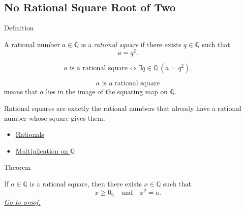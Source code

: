 \subsection*{No Rational Square Root of Two}

\begin{definitionbox}{Definition}
\begin{definition}
\label{def:rational-square}
A rational number $a\in\mathbb{Q}$ is a \emph{rational square} if there
exists $q\in\mathbb{Q}$ such that
\[
a=q^2.
\]
\end{definition}
\end{definitionbox}

\begin{remark*}
\[
\text{$a$ is a rational square}
\Longleftrightarrow
\exists q\in\mathbb{Q}\,(a=q^2).
\]
\end{remark*}

\begin{remark*}
\[
\text{$a$ is a rational square}
\]
means that $a$ lies in the image of the squaring map on $\mathbb{Q}$.
\end{remark*}

\begin{remark*}[Interpretation]
Rational squares are exactly the rational numbers that already have a rational
number whose square gives them.
\end{remark*}

\begin{dependencies}
\begin{itemize}
  \item \hyperref[def:rationals]{Rationals}
  \item \hyperref[def:multiplication-on-q-classes]{Multiplication on $\mathbb{Q}$}
\end{itemize}
\end{dependencies}

\begin{theorembox}{Theorem}
\begin{theorem}
\label{thm:rational-square-root-exists-on-rational-squares}
If $a\in\mathbb{Q}$ is a rational square, then there exists
$x\in\mathbb{Q}$ such that
\[
x\ge 0_{\mathbb{Q}}
\quad\text{and}\quad
x^2=a.
\]
\hyperref[prf:rational-square-root-exists-on-rational-squares]{\textit{Go to proof.}}
\end{theorem}
\end{theorembox}


